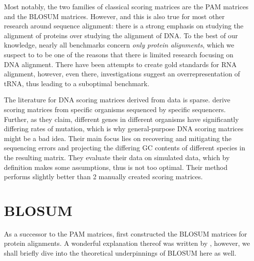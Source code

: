 \documentclass{article}
\begin{document}
Most notably, the two families of classical scoring matrices are the PAM
matrices and the BLOSUM matrices. However, and this is also true for most other
research around sequence alignment: there is a strong emphasis on studying the
alignment of proteins over studying the alignment of DNA. To the best of our
knowledge, nearly all benchmarks concern \emph{only protein alignments}, which
we suspect to to be one of the reasons that there is limited research focusing
on DNA alignment. There have been attempts to create gold standards for RNA
alignment,
however, even there, investigations suggest an overrepresentation of tRNA, thus
leading to a suboptimal benchmark.

The literature for DNA scoring matrices derived from data is sparse.
\textcite{hamadaTrainingAlignmentParameters2017} derive scoring matrices from
specific organisms sequenced by specific sequencers. Further, as they claim,
different genes in different organisms have significantly differing rates of
mutation, which is why general-purpose DNA scoring matrices might be a bad
idea. Their main focus lies on recovering and mitigating the sequencing errors
and projecting the differing GC contents of different species in the resulting
matrix. They evaluate their data on simulated data, which by definition makes
some assumptions, thus is not too optimal. Their method performs slightly
better than 2 manually created scoring matrices.

\section{BLOSUM} As a successor to the PAM matrices,
\textcite{henikoffAminoAcidSubstitution1992} first constructed the BLOSUM
matrices for protein alignments. A wonderful explanation thereof was written by
\textcite{eddyWhereDidBLOSUM622004}, however, we shall briefly dive into the
theoretical underpinnings of BLOSUM here as well.
\end{document}

